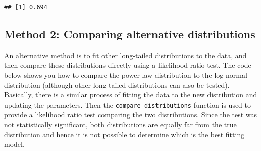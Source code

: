 \documentclass[
]{book}
\newenvironment{Shaded}{\begin{snugshade}}{\end{snugshade}}
\newcommand{\CommentTok}[1]{\textcolor[rgb]{0.56,0.35,0.01}{\textit{#1}}}
\newcommand{\DecValTok}[1]{\textcolor[rgb]{0.00,0.00,0.81}{#1}}
\newcommand{\FunctionTok}[1]{\textcolor[rgb]{0.13,0.29,0.53}{\textbf{#1}}}
\newcommand{\NormalTok}[1]{#1}
\newcommand{\OtherTok}[1]{\textcolor[rgb]{0.56,0.35,0.01}{#1}}
\newcommand{\SpecialCharTok}[1]{\textcolor[rgb]{0.81,0.36,0.00}{\textbf{#1}}}
\begin{document}
\begin{Shaded}
\end{Shaded}

\begin{verbatim}
## [1] 0.694
\end{verbatim}

\subsection{Method 2: Comparing alternative distributions}\label{method-2-comparing-alternative-distributions}

An alternative method is to fit other long-tailed distributions to the data, and then compare these distributions directly using a likelihood ratio test. The code below shows you how to compare the power law distribution to the log-normal distribution (although other long-tailed distributions can also be tested). Basically, there is a similar process of fitting the data to the new distribution and updating the parameters. Then the \texttt{compare\_distributions} function is used to provide a likelihood ratio test comparing the two distributions. Since the test was not statistically significant, both distributions are equally far from the true distribution and hence it is not possible to determine which is the best fitting model.

\begin{Shaded}
\end{Shaded}
\end{document}

